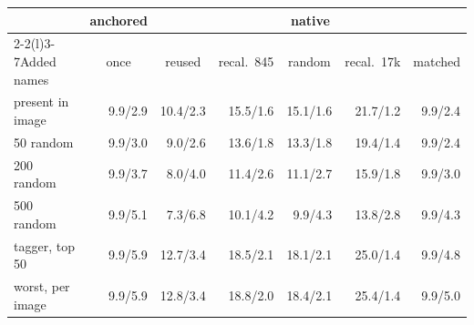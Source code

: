 \setlength{\tabcolsep}{4pt}\begin{tabular}{@{}lrrrrrr@{}}
\toprule
& \multicolumn{1}{c}{anchored} & \multicolumn{5}{c}{native} \\ \cmidrule(lr){2-2}\cmidrule(l){3-7}Added names & \multicolumn{1}{c}{once} & \multicolumn{1}{c}{reused} & \multicolumn{1}{c}{recal.\ 845} & \multicolumn{1}{c}{random} & \multicolumn{1}{c}{recal.\ 17k} & \multicolumn{1}{c}{matched} \\
\midrule
present in image & 9.9/2.9 & 10.4/2.3 & 15.5/1.6 & 15.1/1.6 & 21.7/1.2 & 9.9/2.4 \\
50 random & 9.9/3.0 & 9.0/2.6 & 13.6/1.8 & 13.3/1.8 & 19.4/1.4 & 9.9/2.4 \\
200 random & 9.9/3.7 & 8.0/4.0 & 11.4/2.6 & 11.1/2.7 & 15.9/1.8 & 9.9/3.0 \\
500 random & 9.9/5.1 & 7.3/6.8 & 10.1/4.2 & 9.9/4.3 & 13.8/2.8 & 9.9/4.3 \\
tagger, top 50 & 9.9/5.9 & 12.7/3.4 & 18.5/2.1 & 18.1/2.1 & 25.0/1.4 & 9.9/4.8 \\
worst, per image & 9.9/5.9 & 12.8/3.4 & 18.8/2.0 & 18.4/2.1 & 25.4/1.4 & 9.9/5.0 \\
\bottomrule
\end{tabular}
